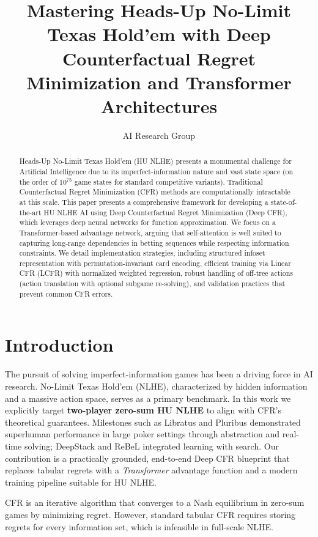 \documentclass[11pt,a4paper]{article}
\title{Mastering Heads-Up No-Limit Texas Hold'em with Deep Counterfactual Regret Minimization and Transformer Architectures}
\author[1]{AI Research Group}
\affil[1]{}
\date{}
\begin{document}
\maketitle

\begin{abstract}
Heads-Up No-Limit Texas Hold'em (HU NLHE) presents a monumental challenge for Artificial Intelligence due to its imperfect-information nature and vast state space (on the order of $10^{75}$ game states for standard competitive variants). Traditional Counterfactual Regret Minimization (CFR) methods are computationally intractable at this scale. This paper presents a comprehensive framework for developing a state-of-the-art HU NLHE AI using Deep Counterfactual Regret Minimization (Deep CFR), which leverages deep neural networks for function approximation. We focus on a Transformer-based advantage network, arguing that self-attention is well suited to capturing long-range dependencies in betting sequences while respecting information constraints. We detail implementation strategies, including structured infoset representation with permutation-invariant card encoding, efficient training via Linear CFR (LCFR) with normalized weighted regression, robust handling of off-tree actions (action translation with optional subgame re-solving), and validation practices that prevent common CFR errors.
\end{abstract}

\section{Introduction}

The pursuit of solving imperfect-information games has been a driving force in AI research. No-Limit Texas Hold'em (NLHE), characterized by hidden information and a massive action space, serves as a primary benchmark. In this work we explicitly target \textbf{two-player zero-sum HU NLHE} to align with CFR's theoretical guarantees. Milestones such as Libratus \cite{brown2017superhuman} and Pluribus \cite{brown2019superhuman} demonstrated superhuman performance in large poker settings through abstraction and real-time solving; DeepStack \cite{moravcik2017deepstack} and ReBeL \cite{brown2020rebel} integrated learning with search. Our contribution is a practically grounded, end-to-end Deep CFR blueprint that replaces tabular regrets with a \emph{Transformer} advantage function and a modern training pipeline suitable for HU NLHE.

CFR \cite{zinkevich2007regret} is an iterative algorithm that converges to a Nash equilibrium in zero-sum games by minimizing regret. However, standard tabular CFR requires storing regrets for every information set, which is infeasible in full-scale NLHE.
\end{document}
